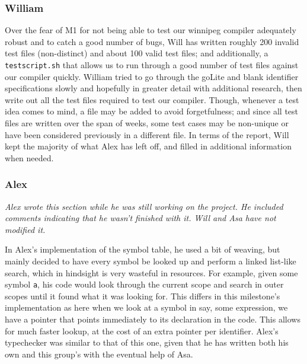 \documentclass{article}
\begin{document}
\subsubsection{William}

Over the fear of M1 for not being able to test our winnipeg compiler adequately robust and to catch a good number of bugs, Will has written roughly 200 invalid test files (non-distinct) and about 100 valid test files; and additionally, a \verb|testscript.sh| that allows us to run through a good number of test files against our compiler quickly. William tried to go through the goLite and blank identifier specifications slowly and hopefully in greater detail with additional research, then write out all the test files required to test our compiler. Though, whenever a test idea comes to mind, a file may be added to avoid forgetfulness; and since all test files are written over the span of weeks, some test cases may be non-unique or have been considered previously in a different file. In terms of the report, Will kept the majority of what Alex has left off, and filled in additional information when needed.

\subsubsection{Alex}

\textit{Alex wrote this section while he was still working on the project. He
  included comments indicating that he wasn't finished with it. Will and Asa
  have not modified it.}


In Alex's implementation of the symbol table, he used a bit of weaving, but
mainly decided to have every symbol be looked up and perform a linked list-like
search, which in hindsight is very wasteful in resources. For example,
given some symbol \verb$a$, his code would look through the current scope and
search in outer scopes until it found what it was looking for. This differs
in this milestone's implementation as here when we look at a symbol in say, some
expression, we have a pointer that points immediately to its declaration in
the code. This allows for much faster lookup, at the cost of an extra pointer
per identifier. Alex's typechecker was similar to that of this one, given
that he has written both his own and this group's with the eventual help of
Asa.
\end{document}
